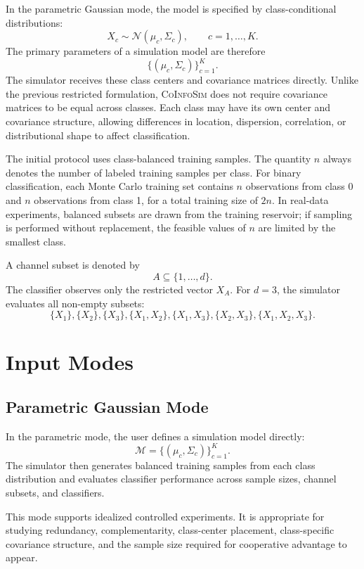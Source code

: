 \documentclass[11pt,a4paper]{article}
\newcommand{\CoInfoSim}{\textsc{CoInfoSim}}
\begin{document}
In the parametric Gaussian mode, the model is specified by class-conditional distributions:
\[
    X_c \sim \mathcal{N}(\mu_c,\Sigma_c),
    \qquad c=1,\ldots,K.
\]
The primary parameters of a simulation model are therefore
\[
    \{(\mu_c,\Sigma_c)\}_{c=1}^{K}.
\]
The simulator receives these class centers and covariance matrices directly. Unlike the previous restricted formulation, \CoInfoSim{} does not require covariance matrices to be equal across classes. Each class may have its own center and covariance structure, allowing differences in location, dispersion, correlation, or distributional shape to affect classification.

The initial protocol uses class-balanced training samples. The quantity $n$ always denotes the number of labeled training samples per class. For binary classification, each Monte Carlo training set contains $n$ observations from class 0 and $n$ observations from class 1, for a total training size of $2n$. In real-data experiments, balanced subsets are drawn from the training reservoir; if sampling is performed without replacement, the feasible values of $n$ are limited by the smallest class.

A channel subset is denoted by
\[
    A\subseteq\{1,\ldots,d\}.
\]
The classifier observes only the restricted vector $X_A$. For $d=3$, the simulator evaluates all non-empty subsets:
\[
\{X_1\},\{X_2\},\{X_3\},
\{X_1,X_2\},\{X_1,X_3\},\{X_2,X_3\},
\{X_1,X_2,X_3\}.
\]

\section{Input Modes}

\subsection{Parametric Gaussian Mode}

In the parametric mode, the user defines a simulation model directly:
\[
    \mathcal{M}=\{(\mu_c,\Sigma_c)\}_{c=1}^{K}.
\]
The simulator then generates balanced training samples from each class distribution and evaluates classifier performance across sample sizes, channel subsets, and classifiers.

This mode supports idealized controlled experiments. It is appropriate for studying redundancy, complementarity, class-center placement, class-specific covariance structure, and the sample size required for cooperative advantage to appear.
\end{document}
